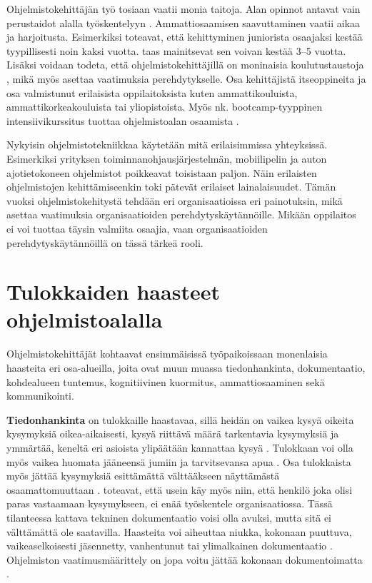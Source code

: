 \documentclass[utf8]{gradu3}
\begin{document}
Ohjelmistokehittäjän työ tosiaan vaatii monia taitoja. Alan opinnot antavat vain perustaidot alalla työskentelyyn \parencite{begel-simon-2008-all-over-again}. Ammattiosaamisen saavuttaminen vaatii aikaa ja harjoitusta. Esimerkiksi \textcite{bologa-lupu-2014} toteavat, että kehittyminen juniorista osaajaksi kestää tyypillisesti noin kaksi vuotta. \textcite{britto-ym-2020} taas mainitsevat sen voivan kestää 3--5 vuotta. Lisäksi voidaan todeta, että ohjelmistokehittäjillä on moninaisia koulutustaustoja \parencite{barnes-ym-2022}, mikä myös asettaa vaatimuksia perehdytykselle. Osa kehittäjistä itseoppineita ja osa valmistunut erilaisista oppilaitoksista kuten ammattikouluista, ammattikorkeakouluista tai yliopistoista. Myös nk. bootcamp-tyyppinen intensiivikurssitus tuottaa ohjelmistoalan osaamista \parencite{lyon-green-2021}.

Nykyisin ohjelmistotekniikkaa käytetään mitä erilaisimmissa yhteyksissä. Esimerkiksi yrityksen toiminnanohjausjärjestelmän, mobiilipelin ja auton ajotietokoneen ohjelmistot poikkeavat toisistaan paljon. Näin erilaisten ohjelmistojen kehittämiseenkin toki pätevät erilaiset lainalaisuudet. Tämän vuoksi ohjelmistokehitystä tehdään eri organisaatioissa eri painotuksin, mikä asettaa vaatimuksia organisaatioiden perehdytyskäytännöille. Mikään oppilaitos ei voi tuottaa täysin valmiita osaajia, vaan organisaatioiden perehdytyskäytännöillä on tässä tärkeä rooli.

\section{Tulokkaiden haasteet ohjelmistoalalla}
\label{luku-tulokkaiden-haasteet}

Ohjelmistokehittäjät kohtaavat ensimmäisissä työpaikoissaan monenlaisia haasteita eri osa-alueilla, joita ovat muun muassa tiedonhankinta, dokumentaatio, kohdealueen tuntemus, kognitiivinen kuormitus, ammattiosaaminen sekä kommunikointi. 

\textbf{Tiedonhankinta} on tulokkaille haastavaa, sillä heidän on vaikea kysyä oikeita kysymyksiä oikea-aikaisesti, kysyä riittävä määrä tarkentavia kysymyksiä ja ymmärtää, keneltä eri asioista ylipäätään kannattaa kysyä %
\parencites%
    {ju-ym-2021}%
    {britto-ym-2019}%
    {craig-ym-2018}%
    {matturro-ym-2017}%
    {dagenais-ym-2010}%
    {begel-simon-2008}%
\relax
%
. Tulokkaan voi olla myös vaikea huomata jääneensä jumiin ja tarvitsevansa apua \parencite{begel-simon-2008}. Osa tulokkaista myös jättää  kysymyksiä esittämättä välttääkseen näyttämästä osaamattomuuttaan 
\parencites%
    {radermacher-ym-2015}%
    {begel-simon-2008}%
\relax.
%
\textcite{dagenais-ym-2010} toteavat, että usein käy myös niin, että henkilö joka olisi paras vastaamaan kysymykseen, ei enää työskentele organisaatiossa. Tässä tilanteessa kattava tekninen dokumentaatio voisi olla avuksi, mutta sitä ei välttämättä ole saatavilla. Haasteita voi aiheuttaa niukka, kokonaan puuttuva, vaikeaselkoisesti jäsennetty, vanhentunut tai ylimalkainen dokumentaatio %
\parencites%
    {matturro-ym-2017}%
    {dagenais-ym-2010}%
    {begel-simon-2008}%
\relax
. Ohjelmiston vaatimusmäärittely on jopa voitu jättää kokonaan dokumentoimatta \parencite{matturro-ym-2017}.
\end{document}

